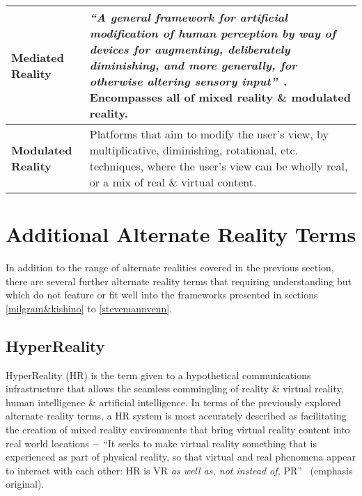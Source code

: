 \begin{center}
\begin{longtable}{| l | p{12cm} |}
\textbf{Mediated Reality} & \textit{``A general framework for artificial modification of human perception by way of devices for augmenting, deliberately diminishing, and more generally, for otherwise altering sensory input''}~\cite{Mann2002a}. Encompasses all of mixed reality \& modulated reality. \\

\hline


\textbf{Modulated Reality} & Platforms that aim to modify the user's view, by multiplicative, diminishing, rotational, etc. techniques, where the user's view can be wholly real, or a mix of real \& virtual content. \\

\hline

\end{longtable}
\end{center}


\section{Additional Alternate Reality Terms}

In addition to the range of alternate realities covered in the previous section, there are several further alternate reality terms that requiring understanding but which do not feature or fit well into the frameworks presented in sections \ref{milgram&kishino} to \ref{stevemannvenn}.


\subsection{HyperReality}

HyperReality (HR) is the term given to a hypothetical communications infrastructure that allows the seamless commingling of reality \& virtual reality, human intelligence \& artificial intelligence. In terms of the previously explored alternate reality terms, a HR system is most accurately described as facilitating the creation of mixed reality environments that bring virtual reality content into real world locations $-$ ``It seeks to make virtual reality something that is experienced as part of physical reality, so that virtual and real phenomena appear to interact with each other: HR is VR \textit{as well as, not instead of,} PR''~\cite{Terashima2001} (emphasis original).

